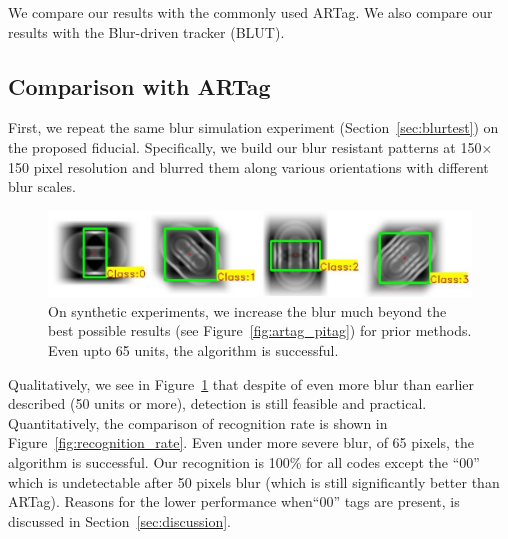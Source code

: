 
We compare our results with the commonly used ARTag. We also compare
our results with the Blur-driven tracker (BLUT)\cite{Wu:2011}.

\subsection{Comparison with ARTag}
First, we repeat the same blur simulation experiment
(Section~\ref{sec:blurtest}) on the proposed fiducial. Specifically,
we build our blur resistant patterns at 150$\times$150 pixel
resolution and blurred them along various orientations with different
blur scales. 

\begin{figure}[t!]
  \includegraphics[width=\linewidth]{figures/fiducial/blur_maximum.pdf}
  \caption[Result: Synthetic experiment]{On synthetic experiments, we increase
  the blur much beyond the best possible results (see Figure~\ref{fig:artag_pitag}) for
    prior methods. Even upto 65 units, the algorithm is successful.}
  \label{fig:blur_maximum}
\end{figure}

Qualitatively, we see in Figure~\ref{fig:blur_maximum} that despite of
even more blur than earlier described (50 units or more), detection is
still feasible and practical.  Quantitatively, the comparison of
recognition rate is shown in Figure~\ref{fig:recognition_rate}.
Even under more severe blur, of 65 pixels, the algorithm is
successful.  Our recognition is 100\% for all codes except the ``00''
which is undetectable after 50 pixels blur (which is still
significantly better than ARTag).  Reasons for the lower performance
when``00'' tags are present, is discussed in
Section~\ref{sec:discussion}.

